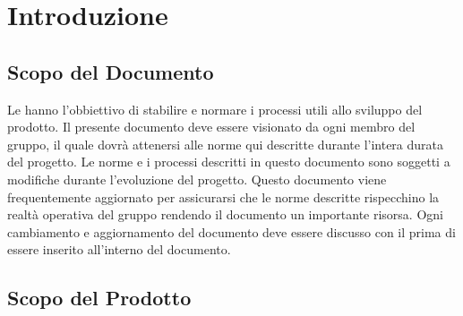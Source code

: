 \section{Introduzione}
\subsection{Scopo del Documento}
Le \NdP{} hanno l'obbiettivo di stabilire e normare i processi utili allo sviluppo del prodotto.
Il presente documento deve essere visionato da ogni membro del gruppo, il quale dovrà attenersi alle norme qui descritte durante l'intera durata del progetto.
Le norme e i processi descritti in questo documento sono soggetti a modifiche durante l'evoluzione del progetto.
Questo documento viene frequentemente aggiornato per assicurarsi che le norme descritte rispecchino la realtà operativa del gruppo rendendo il documento un importante risorsa.
Ogni cambiamento e aggiornamento del documento deve essere discusso con il \RdP{} prima di essere inserito all'interno del documento.


\subsection{Scopo del Prodotto}
